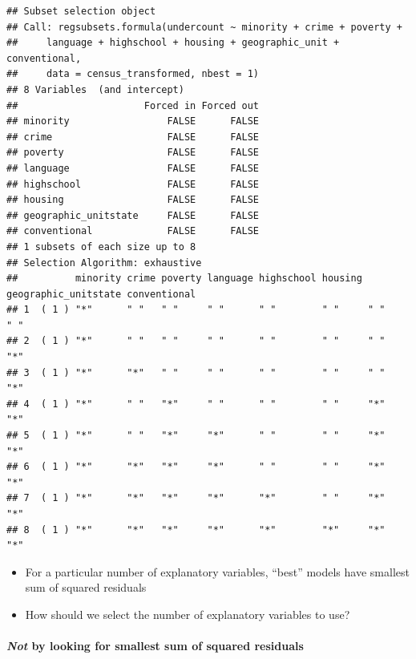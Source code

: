\documentclass[landscape]{article}
\providecommand{\tightlist}{%
  \setlength{\itemsep}{0pt}\setlength{\parskip}{0pt}}
\let\oldparagraph\paragraph
\renewcommand{\paragraph}[1]{\oldparagraph{#1}\mbox{}}
\begin{document}
\begin{verbatim}
## Subset selection object
## Call: regsubsets.formula(undercount ~ minority + crime + poverty + 
##     language + highschool + housing + geographic_unit + conventional, 
##     data = census_transformed, nbest = 1)
## 8 Variables  (and intercept)
##                      Forced in Forced out
## minority                 FALSE      FALSE
## crime                    FALSE      FALSE
## poverty                  FALSE      FALSE
## language                 FALSE      FALSE
## highschool               FALSE      FALSE
## housing                  FALSE      FALSE
## geographic_unitstate     FALSE      FALSE
## conventional             FALSE      FALSE
## 1 subsets of each size up to 8
## Selection Algorithm: exhaustive
##          minority crime poverty language highschool housing geographic_unitstate conventional
## 1  ( 1 ) "*"      " "   " "     " "      " "        " "     " "                  " "         
## 2  ( 1 ) "*"      " "   " "     " "      " "        " "     " "                  "*"         
## 3  ( 1 ) "*"      "*"   " "     " "      " "        " "     " "                  "*"         
## 4  ( 1 ) "*"      " "   "*"     " "      " "        " "     "*"                  "*"         
## 5  ( 1 ) "*"      " "   "*"     "*"      " "        " "     "*"                  "*"         
## 6  ( 1 ) "*"      "*"   "*"     "*"      " "        " "     "*"                  "*"         
## 7  ( 1 ) "*"      "*"   "*"     "*"      "*"        " "     "*"                  "*"         
## 8  ( 1 ) "*"      "*"   "*"     "*"      "*"        "*"     "*"                  "*"
\end{verbatim}

\begin{itemize}
\tightlist
\item
  For a particular number of explanatory variables, ``best'' models have
  smallest sum of squared residuals
\item
  How should we select the number of explanatory variables to use?
\end{itemize}

\newpage

\paragraph{\texorpdfstring{\emph{Not} by looking for smallest sum of
squared
residuals}{Not by looking for smallest sum of squared residuals}}\label{not-by-looking-for-smallest-sum-of-squared-residuals}
\end{document}
